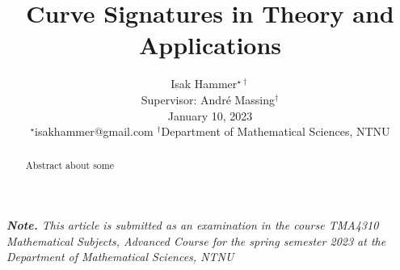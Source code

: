 \documentclass[10pt,conference]{IEEEtran}
\title{ {\Large \textbf{Curve Signatures in Theory and Applications }} }
\begin{document}
\author{
Isak Hammer$^{\star\dagger}$  \\
{\small Supervisor: André Massing$^{\dagger} $  } \\
{\small  January 10, 2023}\\
{\footnotesize $^\star$isakhammer@gmail.com }
{\footnotesize $^\dagger$Department of Mathematical Sciences, NTNU}\\
}

\maketitle
\begin{sloppy}
\textit{ \textbf{Note.} This article is submitted as an examination in the course TMA4310 Mathematical Subjects, Advanced Course for the spring semester 2023 at the Department of Mathematical Sciences, NTNU \\}


\begin{abstract}
    Abstract about some
\end{abstract}

    
    
    

    \printbibliography
\end{sloppy}
\end{document}
